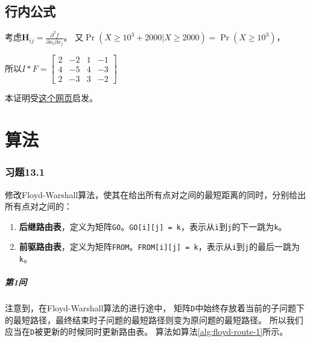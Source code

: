 \documentclass{dreamClass}
\begin{document}
\subsection{行内公式}
考虑\(\mathbf{H}_{i j}=\frac{\partial^{2} f}{\partial x_{i} \partial x_{j}}\)。
又\(\operatorname{Pr}(X \geq 10^3 + 2000 | X \geq 2000) = \operatorname{Pr}(X \geq 10^3)\)，

所以\(I * F = \begin{bmatrix}
    2 & -2  & 1 & - 1 \\
    4 & - 5 & 4 & - 3 \\
    2 & - 3 & 3 & - 2
\end{bmatrix}\)

本证明受\href{https://datawhalechina.github.io/pumpkin-book/#/chapter2/chapter2?id=221}{这个网页}启发。

\section{算法}
\subsubsection*{习题13.1}
\begin{problem*}
    修改Floyd-Warshall算法，使其在给出所有点对之间的最短距离的同时，分别给出所有点对之间的：
    \begin{enumerate}
        \item \textbf{\kaishu 后继路由表}，定义为矩阵\texttt{GO}。\texttt{GO[i][j] = k}，表示从\texttt{i}到\texttt{j}的下一跳为\texttt{k}。
        \item \textbf{\kaishu 前驱路由表}，定义为矩阵\texttt{FROM}。\texttt{FROM[i][j] = k}，表示从\texttt{i}到\texttt{j}的最后一跳为\texttt{k}。
    \end{enumerate}
\end{problem*}
\subparagraph*{第1问}
注意到，在Floyd-Warshall算法的进行途中，
矩阵\texttt{D}中始终存放着当前的子问题下的最短路径，最终结束时子问题的最短路径则变为原问题的最短路径。
所以我们应当在\texttt{D}被更新的时候同时更新路由表。
算法如算法\ref{alg:floyd-route-1}所示。
\end{document}
